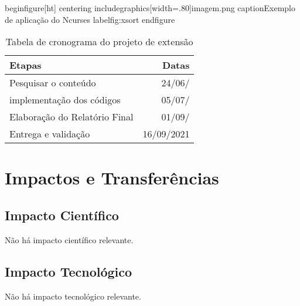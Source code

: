 \documentclass[a4paper,10pt]{article} %
\begin{document}
 begin{figure}[ht]
 centering
 includegraphics[width=.80\linewidth]{imagem.png}
 caption{Exemplo de aplicação do Ncurses}
 label{fig:xsort}
 end{figure}



\begin{table}
\begin{center}
 \caption{Tabela de cronograma do projeto de extensão}
\begin{tabular}{|l|r|}
  \hline \hline
  \textbf{Etapas} & \textbf{Datas} \\ \hline \hline
   Pesquisar o conteúdo & 24/06/ \\ \hline
   implementação dos códigos & 05/07/ \\ \hline
   Elaboração do Relatório Final  & 01/09/ \\ \hline
   Entrega e validação & 16/09/2021 \\ \hline \hline
\end{tabular} 
\label{tab:resultados}
\end{center}
\end{table}


\section{Impactos e Transferências}

\subsection{Impacto Científico}

Não há impacto científico relevante.

\subsection{Impacto Tecnológico}

Não há impacto tecnológico relevante.
\end{document}
